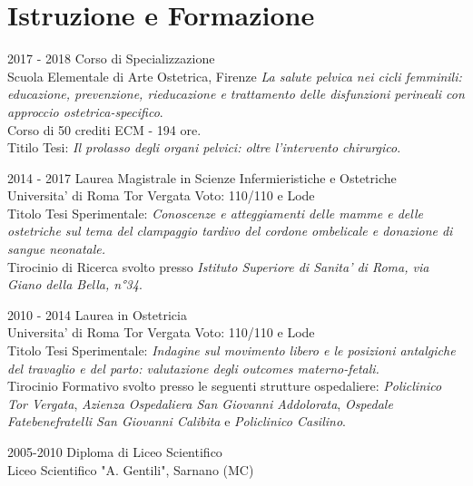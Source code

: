 \documentclass[11pt]{friggeri-cv}
\begin{document}
\vspace{-15pt}
\section{Istruzione e Formazione}
\begin{entrylist}
  \entry
  {2017 - 2018}
  {Corso di Specializzazione}
  {\\Scuola Elementale di Arte Ostetrica, Firenze}
  {\emph{La salute pelvica nei cicli femminili: educazione, prevenzione, 
    rieducazione e trattamento delle disfunzioni perineali con approccio 
    ostetrica-specifico}. \\
    Corso di 50 crediti ECM - 194 ore.\\ 
    Titilo Tesi: \emph{Il prolasso degli organi pelvici: oltre l’intervento 
    chirurgico}.\\
  }

  \entry
  {2014 - 2017}
  {Laurea Magistrale in Scienze Infermieristiche e Ostetriche}
  {\\Universita' di Roma Tor Vergata}
  {Voto: 110/110 e Lode\\ Titolo Tesi Sperimentale: \emph{Conoscenze e 
    atteggiamenti delle mamme e delle ostetriche sul tema del clampaggio 
    tardivo del cordone ombelicale e donazione di sangue neonatale.} 
    \\Tirocinio di Ricerca svolto presso \textit{Istituto Superiore di Sanita' 
    di Roma, via Giano della Bella, n°34}.\\
  }
  
  \entry
  {2010 - 2014}
  {Laurea in Ostetricia}
  {\\Universita' di Roma Tor Vergata}
  {Voto: 110/110 e Lode\\
    Titolo Tesi Sperimentale: \emph{Indagine sul movimento libero e le 
    posizioni 
    antalgiche del travaglio e del parto: valutazione degli outcomes 
    materno-fetali.} \\
    Tirocinio Formativo svolto presso le seguenti strutture ospedaliere: 
    \textit{Policlinico Tor 
    Vergata}, \textit{Azienza Ospedaliera San Giovanni Addolorata}, 
    \textit{Ospedale Fatebenefratelli San Giovanni Calibita} e 
    \textit{Policlinico 
    Casilino}.\\
  }
  
  \entry
  {2005-2010}
  {Diploma di Liceo Scientifico}
  {\\Liceo Scientifico "A. Gentili", Sarnano (MC)}
  {\\}
\end{entrylist}
\end{document}
